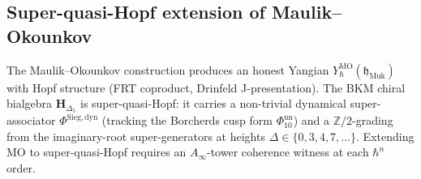 \subsection{Super-quasi-Hopf extension of Maulik--Okounkov}
\label{subsec:modtr-super-quasi-hopf}

The Maulik--Okounkov construction produces an honest Yangian
$Y^{\mathrm{MO}}_\hbar(\mathfrak h_{\mathrm{Muk}})$ with Hopf structure
(FRT coproduct, Drinfeld J-presentation). The BKM chiral bialgebra
$\mathbf H_{\Delta_5}$ is super-quasi-Hopf: it carries a non-trivial
dynamical super-associator $\Phi^{\mathrm{Sieg,dyn}}$ (tracking the
Borcherds cusp form $\Phi_{10}^{\mathrm{un}}$) and a $\mathbb Z/2$-grading from the
imaginary-root super-generators at heights
$\Delta\in\{0, 3, 4, 7,\ldots\}$. Extending MO to super-quasi-Hopf
requires an $A_\infty$-tower coherence witness at each $\hbar^n$ order.

